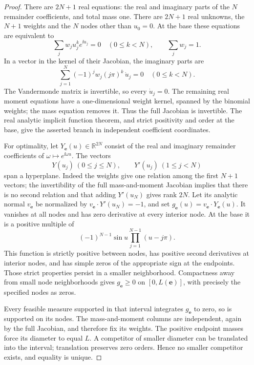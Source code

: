 \documentclass[11pt,a4paper]{article}
\theoremstyle{remark}\newtheorem{remark}[theorem]{Remark}
\newcommand{\R}{\mathbb R}\newcommand{\C}{\mathbb C}
\begin{document}
\begin{proof}
There are $2N+1$ real equations: the real and imaginary parts of the $N$ remainder coefficients, and total mass one. There are $2N+1$ real unknowns, the $N+1$ weights and the $N$ nodes other than $u_0=0$. At the base these equations are equivalent to
\[
 \sum_jw_j u_j^k e^{\ii u_j}=0\quad(0\le k<N),\qquad \sum_jw_j=1.
\]
In a vector in the kernel of their Jacobian, the imaginary parts are
\[
 \sum_{j=1}^N(-1)^jw_j(j\pi)^k\,\dot u_j=0\quad(0\le k<N).
\]
The Vandermonde matrix is invertible, so every $\dot u_j=0$. The remaining real moment equations have a one-dimensional weight kernel, spanned by the binomial weights; the mass equation removes it. Thus the full Jacobian is invertible. The real analytic implicit function theorem, and strict positivity and order at the base, give the asserted branch in independent coefficient coordinates.

For optimality, let $Y_{\boldsymbol e}(u)\in\R^{2N}$ consist of the real and imaginary remainder coefficients of $\omega\mapsto e^{\ii\omega u}$. The vectors
\[
 Y(u_j)\ (0\le j\le N),\qquad Y'(u_j)\ (1\le j<N)
\]
span a hyperplane. Indeed the weights give one relation among the first $N+1$ vectors; the invertibility of the full mass-and-moment Jacobian implies that there is no second relation and that adding $Y'(u_N)$ gives rank $2N$. Let its analytic normal $v_{\boldsymbol e}$ be normalized by
$v_{\boldsymbol e}\cdot Y'(u_N)=-1$, and set $g_{\boldsymbol e}(u)=v_{\boldsymbol e}\cdot Y_{\boldsymbol e}(u)$.
It vanishes at all nodes and has zero derivative at every interior node. At the base it is a positive multiple of
\[
 (-1)^{N-1}\sin u\prod_{j=1}^{N-1}(u-j\pi).
\]
This function is strictly positive between nodes, has positive second derivatives at interior nodes, and has simple zeros of the appropriate sign at the endpoints. Those strict properties persist in a smaller neighborhood. Compactness away from small node neighborhoods gives
$g_{\boldsymbol e}\ge0$ on $[0,L(\boldsymbol e)]$, with precisely the specified nodes as zeros.

Every feasible measure supported in that interval integrates $g_{\boldsymbol e}$ to zero, so is supported on its nodes. The mass-and-moment columns are independent, again by the full Jacobian, and therefore fix its weights. The positive endpoint masses force its diameter to equal $L$. A competitor of smaller diameter can be translated into the interval; translation preserves zero orders. Hence no smaller competitor exists, and equality is unique.
\end{proof}
\end{document}
